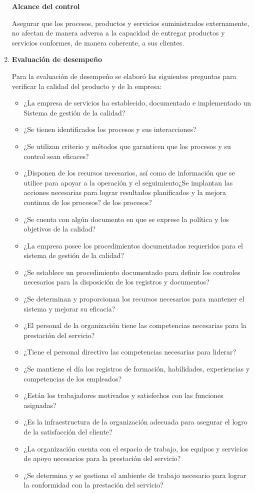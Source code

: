 \documentclass[10pt,a4paper]{article}
\begin{document}
\begin{enumerate}
\textbf{Alcance del control}

Asegurar que los procesos, productos y servicios suministrados externamente, no afectan de manera adversa a la capacidad de entregar productos y servicios conformes, de manera coherente, a sus clientes.

\item \textbf{Evaluación de desempeño}

Para la evaluación de desempeño se elaboró las siguientes preguntas para verificar la calidad del producto y de la empresa:

\begin{itemize}
\item ¿La empresa de servicios ha establecido, documentado e implementado un Sistema de gestión de la calidad?
\item ¿Se tienen identificados los procesos y sus interacciones?
\item ¿Se utilizan criterio y métodos que garanticen que los procesos y su control sean eficaces?
\item ¿Disponen de los recursos necesarios, así como de información que se utilice para apoyar a la operación y el seguimiento¿Se implantan las acciones necesarias para lograr resultados planificados y la mejora continua de los procesos?  de los procesos?
\item ¿Se cuenta con algún documento en que se exprese la política y los objetivos de la calidad?
\item ¿La empresa posee los procedimientos documentados requeridos para el sistema de gestión de la calidad?
\item ¿Se establece un procedimiento documentado para definir los controles necesarios para la disposición de los registros y documentos?
\item ¿Se determinan y proporcionan los recursos necesarios para mantener el sistema y mejorar su eficacia?
\item ¿El personal de la organización tiene las competencias necesarias para la prestación del servicio?
\item ¿Tiene el personal directivo las competencias necesarias para liderar?
\item ¿Se mantiene el día los registros de formación, habilidades, experiencias y competencias de los empleados?
\item ¿Están los trabajadores motivados y satisfechos con las funciones asignadas?
\item ¿Es la infraestructura de la organización adecuada para asegurar el logro de la satisfacción del cliente?
\item ¿La organización cuenta con el espacio de trabajo, los equipos y servicios de apoyo necesarios para la prestación del servicio?
\item ¿Se determina y se gestiona el ambiente de trabajo necesario para lograr la conformidad con la prestación del servicio?
\end{itemize}


\end{enumerate}
\end{document}
